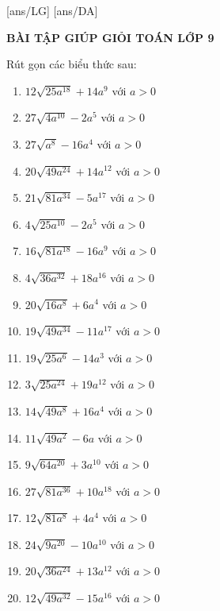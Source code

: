 \documentclass[12pt,a4paper]{article}
\begin{document}
	[ans/LG]
	[ans/DA]
	\pagestyle{fancy}
	\fancyhf{}
	\begin{center}
		{\bf\Large BÀI TẬP GIÚP GIỎI TOÁN LỚP 9}
	\end{center}

\begin{ex}
	Rút gọn các biểu thức sau:
	\begin{enumerate}
		\item $12\sqrt{25a^{18}}+14a^{9}$ với $a>0$ 
		\item $27\sqrt{4a^{10}}-2a^{5}$ với $a>0$ 
		\item $27\sqrt{a^{8}}-16a^{4}$ với $a>0$ 
		\item $20\sqrt{49a^{24}}+14a^{12}$ với $a>0$ 
		\item $21\sqrt{81a^{34}}-5a^{17}$ với $a>0$ 
		\item $4\sqrt{25a^{10}}-2a^{5}$ với $a>0$ 
		\item $16\sqrt{81a^{18}}-16a^{9}$ với $a>0$ 
		\item $4\sqrt{36a^{32}}+18a^{16}$ với $a>0$ 
		\item $20\sqrt{16a^{8}}+6a^{4}$ với $a>0$ 
		\item $19\sqrt{49a^{34}}-11a^{17}$ với $a>0$ 
		\item $19\sqrt{25a^{6}}-14a^{3}$ với $a>0$
		\item $3\sqrt{25a^{24}}+19a^{12}$ với $a>0$
		\item $14\sqrt{49a^{8}}+16a^{4}$ với $a>0$
		\item $11\sqrt{49a^{2}}-6a$ với $a>0$
		\item $9\sqrt{64a^{20}}+3a^{10}$ với $a>0$
		\item $27\sqrt{81a^{36}}+10a^{18}$ với $a>0$
		\item $12\sqrt{81a^{8}}+4a^{4}$ với $a>0$
		\item $24\sqrt{9a^{20}}-10a^{10}$ với $a>0$
		\item $20\sqrt{36a^{24}}+13a^{12}$ với $a>0$
		\item $12\sqrt{49a^{32}}-15a^{16}$ với $a>0$
	\end{enumerate}
\end{ex}
\end{document}
